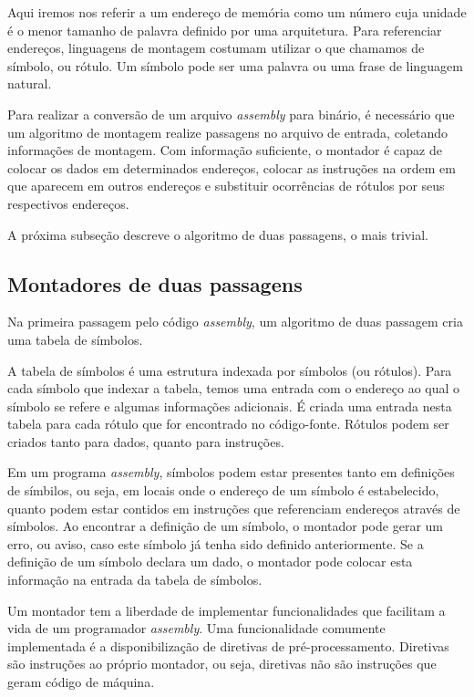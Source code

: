 Aqui iremos nos referir a um endereço de memória como um número cuja unidade é o menor tamanho de palavra definido por uma arquitetura. Para referenciar endereços, linguagens de montagem costumam utilizar o que chamamos de símbolo, ou rótulo. Um símbolo pode ser uma palavra ou uma frase de linguagem natural.

Para realizar a conversão de um arquivo \textit{assembly} para binário, é necessário que um algoritmo de montagem realize passagens no arquivo de entrada, coletando informações de montagem. Com informação suficiente, o montador é capaz de colocar os dados em determinados endereços, colocar as instruções na ordem em que aparecem em outros endereços e substituir ocorrências de rótulos por seus respectivos endereços.

A próxima subseção descreve o algoritmo de duas passagens, o mais trivial.

\subsection{Montadores de duas passagens}

Na primeira passagem pelo código \textit{assembly}, um algoritmo de duas passagem cria uma tabela de símbolos.

A tabela de símbolos é uma estrutura indexada por símbolos (ou rótulos). Para cada símbolo que indexar a tabela, temos uma entrada com o endereço ao qual o símbolo se refere e algumas informações adicionais. É criada uma entrada nesta tabela para cada rótulo que for encontrado no código-fonte. Rótulos podem ser criados tanto para dados, quanto para instruções.

Em um programa \textit{assembly}, símbolos podem estar presentes tanto em definições de símbilos, ou seja, em locais onde o endereço de um símbolo é estabelecido, quanto podem estar contidos em instruções que referenciam endereços através de símbolos. Ao encontrar a definição de um símbolo, o montador pode gerar um erro, ou aviso, caso este símbolo já tenha sido definido anteriormente. Se a definição de um símbolo declara um dado, o montador pode colocar esta informação na entrada da tabela de símbolos.

Um montador tem a liberdade de implementar funcionalidades que facilitam a vida de um programador \textit{assembly}. Uma funcionalidade comumente implementada é a disponibilização de diretivas de pré-processamento. Diretivas são instruções ao próprio montador, ou seja, diretivas não são instruções que geram código de máquina.

